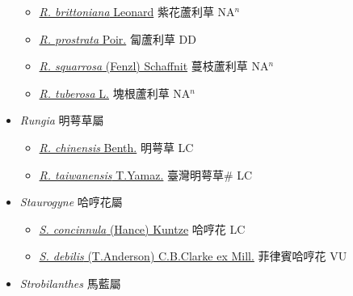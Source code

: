 \begin{itemize}
  \begin{itemize}
        \item[] \href{http://www.theplantlist.org/tpl1.1/search?q=Ruellia+brittoniana}{\textit{R. brittoniana} Leonard}   紫花蘆利草 NA$^n$
        \item[] \href{http://www.theplantlist.org/tpl1.1/search?q=Ruellia+prostrata}{\textit{R. prostrata} Poir.}   匐蘆利草 DD
        \item[] \href{http://www.theplantlist.org/tpl1.1/search?q=Ruellia+squarrosa}{\textit{R. squarrosa} (Fenzl) Schaffnit}   蔓枝蘆利草 NA$^n$
        \item[] \href{http://www.theplantlist.org/tpl1.1/search?q=Ruellia+tuberosa}{\textit{R. tuberosa} L.}   塊根蘆利草 NA$^n$
  \end{itemize}
 \item[] \textit{Rungia} 明萼草屬
                    
  \begin{itemize}
        \item[] \href{http://www.theplantlist.org/tpl1.1/search?q=Rungia+chinensis}{\textit{R. chinensis} Benth.}   明萼草 LC
        \item[] \href{http://www.theplantlist.org/tpl1.1/search?q=Rungia+taiwanensis}{\textit{R. taiwanensis} T.Yamaz.}   臺灣明萼草\# LC
  \end{itemize}
 \item[] \textit{Staurogyne} 哈哼花屬
                    
  \begin{itemize}
        \item[] \href{http://www.theplantlist.org/tpl1.1/search?q=Staurogyne+concinnula}{\textit{S. concinnula} (Hance) Kuntze}   哈哼花 LC
        \item[] \href{http://www.theplantlist.org/tpl1.1/search?q=Staurogyne+debilis}{\textit{S. debilis} (T.Anderson) C.B.Clarke ex Mill.}   菲律賓哈哼花 VU
  \end{itemize}
 \item[] \textit{Strobilanthes} 馬藍屬
                    

\end{itemize}
